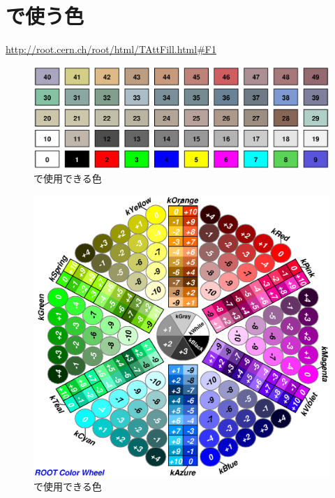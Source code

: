  \section{\ROOT で使う色}

 \url{http://root.cern.ch/root/html/TAttFill.html#F1}
 \begin{figure}[htbp]
  \begin{center}
   \includegraphics[width = 140mm]{./picture/filareacolor.eps}
  \end{center}
  \caption{\ROOT で使用できる色}
  \label{Fig:filareacolor}
 \end{figure}

 \begin{figure}[htbp]
  \begin{center}
   \includegraphics[width = 140mm]{./picture/rootcolorwheel.eps}
  \end{center}
  \caption{\ROOT で使用できる色}
  \label{Fig:rootcolorwheel}
 \end{figure}

